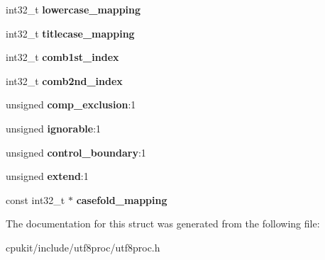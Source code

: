 \begin{DoxyCompactItemize}
int32\+\_\+t {\bfseries lowercase\+\_\+mapping}
\item 
\mbox{\label{structutf8proc__property__struct_a56a5e86e49e531328b67c6b3aebd6a5e}} 
int32\+\_\+t {\bfseries titlecase\+\_\+mapping}
\item 
\mbox{\label{structutf8proc__property__struct_a4a91a9514c34680b8fa8d502441e5852}} 
int32\+\_\+t {\bfseries comb1st\+\_\+index}
\item 
\mbox{\label{structutf8proc__property__struct_a2d218f817e1a7ecd3b7e44f75dcbc480}} 
int32\+\_\+t {\bfseries comb2nd\+\_\+index}
\item 
\mbox{\label{structutf8proc__property__struct_add11d0d65b7ecfb3a7cca6f676e44386}} 
unsigned {\bfseries comp\+\_\+exclusion}\+:1
\item 
\mbox{\label{structutf8proc__property__struct_a92c5ead96b0a8594913dbee297cf75bb}} 
unsigned {\bfseries ignorable}\+:1
\item 
\mbox{\label{structutf8proc__property__struct_a94d943a5b83126dd332b7556d232bc75}} 
unsigned {\bfseries control\+\_\+boundary}\+:1
\item 
\mbox{\label{structutf8proc__property__struct_acb0e2366d400ad2e4106d3bb88640024}} 
unsigned {\bfseries extend}\+:1
\item 
\mbox{\label{structutf8proc__property__struct_aa28e2ca7e8ce8ee746b8b45960349e87}} 
const int32\+\_\+t $\ast$ {\bfseries casefold\+\_\+mapping}
\end{DoxyCompactItemize}


The documentation for this struct was generated from the following file\+:\begin{DoxyCompactItemize}
\item 
cpukit/include/utf8proc/utf8proc.\+h\end{DoxyCompactItemize}

